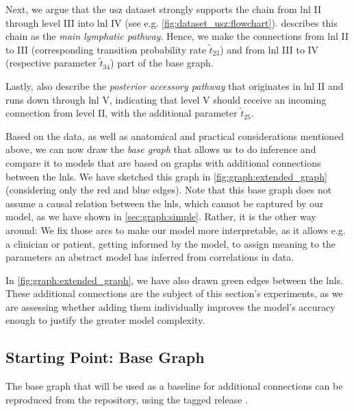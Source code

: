 \documentclass[\relativeRoot/main.tex]{subfiles}
\begin{document}
Next, we argue that the \gls{usz} dataset strongly supports the chain from \gls{lnl} II through level III into \gls{lnl} IV (see e.g. \cref{fig:dataset_usz:flowchart}).  describes this chain as the \emph{main lymphatic pathway}. Hence, we make the connections from \gls{lnl} II to III (corresponding transition probability rate $\tilde{t}_{23}$) and from \gls{lnl} III to IV (respective parameter $\tilde{t}_{34}$) part of the base graph.

Lastly,  also describe the \emph{posterior accessory pathway} that originates in \gls{lnl} II and runs down through \gls{lnl} V, indicating that level V should receive an incoming connection from level II, with the additional parameter $\tilde{t}_{25}$.

Based on the data, as well as anatomical and practical considerations mentioned above, we can now draw the \emph{base graph} that allows us to do inference and compare it to models that are based on graphs with additional connections between the \glspl{lnl}. We have sketched this graph in \cref{fig:graph:extended_graph} (considering only the red and blue edges). Note that this base graph does not assume a causal relation between the \glspl{lnl}, which cannot be captured by our model, as we have shown in \cref{sec:graph:simple}. Rather, it is the other way around: We fix those arcs to make our model more interpretable, as it allows e.g. a clinician or patient, getting informed by the model, to assign meaning to the parameters an abstract model has inferred from correlations in data.

In \cref{fig:graph:extended_graph}, we have also drawn green edges between the \glspl{lnl}. These additional connections are the subject of this section's experiments, as we are assessing whether adding them individually improves the model's accuracy enough to justify the greater model complexity.

\subsection{Starting Point: Base Graph}
\label{subsec:graph:extended:base}

\begin{tcolorbox}[title=\faIcon{recycle} Reproducibility, parbox=false]
    The base graph that will be used as a baseline for additional connections can be reproduced from the  repository, using the tagged release .
\end{tcolorbox}
\end{document}
